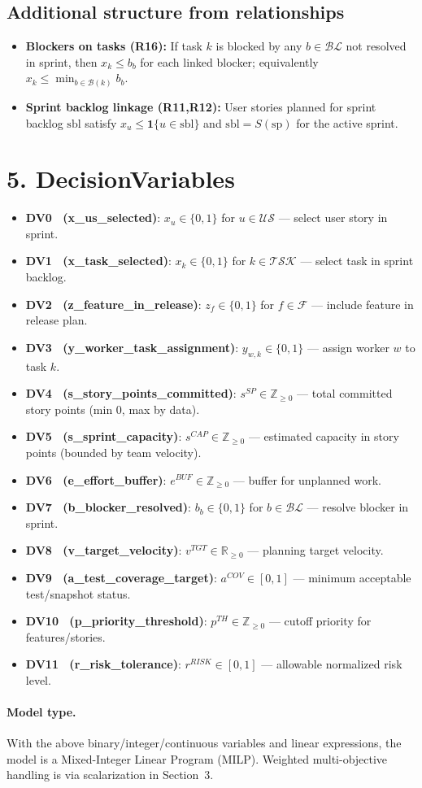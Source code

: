 \documentclass[11pt,a4paper]{article}
\begin{document}
\subsection*{Additional structure from relationships}
\begin{itemize}[leftmargin=2em]
  \item \textbf{Blockers on tasks (R16):} If task $k$ is blocked by any $b\in \mathcal{BL}$ not resolved in sprint, then $x_k \le b_b$ for each linked blocker; equivalently $x_k \le \min_{b \in \mathcal{B}(k)} b_b$.
  \item \textbf{Sprint backlog linkage (R11,R12):} User stories planned for sprint backlog $\mathrm{sbl}$ satisfy $x_u \le \mathbf{1}\{u \in \mathrm{sbl}\}$ and $\mathrm{sbl}=S(\mathrm{sp})$ for the active sprint.
\end{itemize}

\section{5. DecisionVariables}
\begin{itemize}[leftmargin=2em]
  \item \textbf{DV0 \ (x\_us\_selected)}: $x_u \in \{0,1\}$ for $u\in\mathcal{US}$ — select user story in sprint.
  \item \textbf{DV1 \ (x\_task\_selected)}: $x_k \in \{0,1\}$ for $k\in\mathcal{TSK}$ — select task in sprint backlog.
  \item \textbf{DV2 \ (z\_feature\_in\_release)}: $z_f \in \{0,1\}$ for $f\in\mathcal{F}$ — include feature in release plan.
  \item \textbf{DV3 \ (y\_worker\_task\_assignment)}: $y_{w,k} \in \{0,1\}$ — assign worker $w$ to task $k$.
  \item \textbf{DV4 \ (s\_story\_points\_committed)}: $s^{SP} \in \mathbb{Z}_{\ge 0}$ — total committed story points (min 0, max by data).
  \item \textbf{DV5 \ (s\_sprint\_capacity)}: $s^{CAP} \in \mathbb{Z}_{\ge 0}$ — estimated capacity in story points (bounded by team velocity).
  \item \textbf{DV6 \ (e\_effort\_buffer)}: $e^{BUF} \in \mathbb{Z}_{\ge 0}$ — buffer for unplanned work.
  \item \textbf{DV7 \ (b\_blocker\_resolved)}: $b_b \in \{0,1\}$ for $b\in\mathcal{BL}$ — resolve blocker in sprint.
  \item \textbf{DV8 \ (v\_target\_velocity)}: $v^{TGT} \in \mathbb{R}_{\ge 0}$ — planning target velocity.
  \item \textbf{DV9 \ (a\_test\_coverage\_target)}: $a^{COV} \in [0,1]$ — minimum acceptable test/snapshot status.
  \item \textbf{DV10 \ (p\_priority\_threshold)}: $p^{TH} \in \mathbb{Z}_{\ge 0}$ — cutoff priority for features/stories.
  \item \textbf{DV11 \ (r\_risk\_tolerance)}: $r^{RISK} \in [0,1]$ — allowable normalized risk level.
\end{itemize}

\paragraph{Model type.}
With the above binary/integer/continuous variables and linear expressions, the model is a Mixed-Integer Linear Program (MILP). Weighted multi-objective handling is via scalarization in Section~3.
\end{document}
